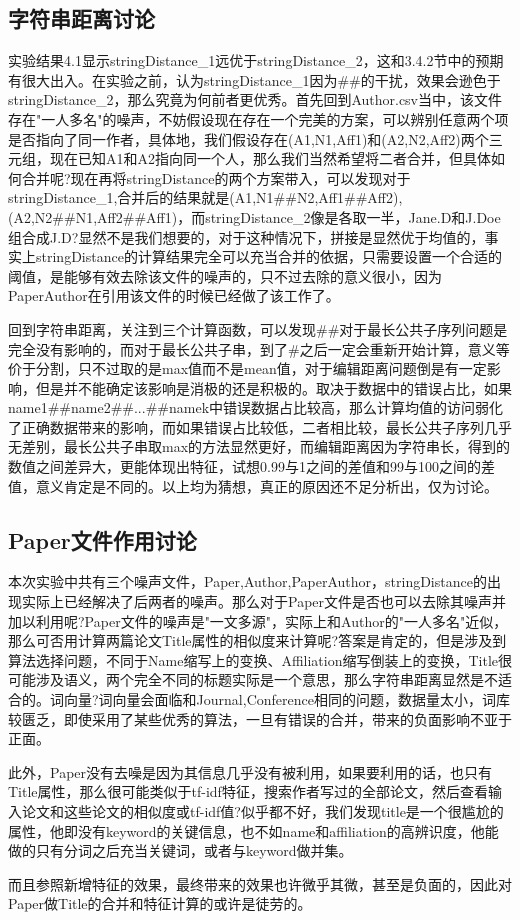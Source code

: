 \documentclass{mcmthesis}
\begin{document}
\subsection{字符串距离讨论} 
\par 实验结果4.1显示stringDistance\_1远优于stringDistance\_2，这和3.4.2节中的预期有很大出入。在实验之前，认为stringDistance\_1因为\#\#的干扰，效果会逊色于stringDistance\_2，那么究竟为何前者更优秀。首先回到Author.csv当中，该文件存在"一人多名"的噪声，不妨假设现在存在一个完美的方案，可以辨别任意两个项是否指向了同一作者，具体地，我们假设存在(A1,N1,Aff1)和(A2,N2,Aff2)两个三元组，现在已知A1和A2指向同一个人，那么我们当然希望将二者合并，但具体如何合并呢?现在再将stringDistance的两个方案带入，可以发现对于stringDistance\_1,合并后的结果就是(A1,N1\#\#N2,Aff1\#\#Aff2),(A2,N2\#\#N1,Aff2\#\#Aff1)，而stringDistance\_2像是各取一半，Jane.D和J.Doe组合成J.D?显然不是我们想要的，对于这种情况下，拼接是显然优于均值的，事实上stringDistance的计算结果完全可以充当合并的依据，只需要设置一个合适的阈值，是能够有效去除该文件的噪声的，只不过去除的意义很小，因为PaperAuthor在引用该文件的时候已经做了该工作了。
\par 回到字符串距离，关注到三个计算函数，可以发现\#\#对于最长公共子序列问题是完全没有影响的，而对于最长公共子串，到了\#之后一定会重新开始计算，意义等价于分割，只不过取的是max值而不是mean值，对于编辑距离问题倒是有一定影响，但是并不能确定该影响是消极的还是积极的。取决于数据中的错误占比，如果name1\#\#name2\#\#...\#\#namek中错误数据占比较高，那么计算均值的访问弱化了正确数据带来的影响，而如果错误占比较低，二者相比较，最长公共子序列几乎无差别，最长公共子串取max的方法显然更好，而编辑距离因为字符串长，得到的数值之间差异大，更能体现出特征，试想0.99与1之间的差值和99与100之间的差值，意义肯定是不同的。以上均为猜想，真正的原因还不足分析出，仅为讨论。

\subsection{Paper文件作用讨论}
\par 本次实验中共有三个噪声文件，Paper,Author,PaperAuthor，stringDistance的出现实际上已经解决了后两者的噪声。那么对于Paper文件是否也可以去除其噪声并加以利用呢?Paper文件的噪声是"一文多源"，实际上和Author的"一人多名"近似，那么可否用计算两篇论文Title属性的相似度来计算呢?答案是肯定的，但是涉及到算法选择问题，不同于Name缩写上的变换、Affiliation缩写倒装上的变换，Title很可能涉及语义，两个完全不同的标题实际是一个意思，那么字符串距离显然是不适合的。词向量?词向量会面临和Journal,Conference相同的问题，数据量太小，词库较匮乏，即使采用了某些优秀的算法，一旦有错误的合并，带来的负面影响不亚于正面。
\par 此外，Paper没有去噪是因为其信息几乎没有被利用，如果要利用的话，也只有Title属性，那么很可能类似于tf-idf特征，搜索作者写过的全部论文，然后查看输入论文和这些论文的相似度或tf-idf值?似乎都不好，我们发现title是一个很尴尬的属性，他即没有keyword的关键信息，也不如name和affiliation的高辨识度，他能做的只有分词之后充当关键词，或者与keyword做并集。
\par 而且参照新增特征的效果，最终带来的效果也许微乎其微，甚至是负面的，因此对Paper做Title的合并和特征计算的或许是徒劳的。
\end{document}

